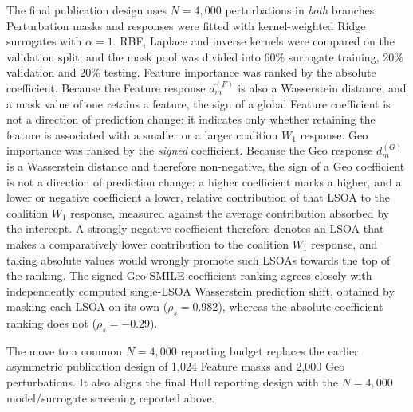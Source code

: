 The final publication design uses $N=4{,}000$ perturbations in \emph{both} branches. Perturbation masks and responses were fitted with kernel-weighted Ridge surrogates with $\alpha=1$. RBF, Laplace and inverse kernels were compared on the validation split, and the mask pool was divided into 60\% surrogate training, 20\% validation and 20\% testing. Feature importance was ranked by the absolute coefficient. Because the Feature response $d_m^{(F)}$ is also a Wasserstein distance, and a mask value of one retains a feature, the sign of a global Feature coefficient is not a direction of prediction change: it indicates only whether retaining the feature is associated with a smaller or a larger coalition $W_1$ response. Geo importance was ranked by the \emph{signed} coefficient. Because the Geo response $d_m^{(G)}$ is a Wasserstein distance and therefore non-negative, the sign of a Geo coefficient is not a direction of prediction change: a higher coefficient marks a higher, and a lower or negative coefficient a lower, relative contribution of that LSOA to the coalition $W_1$ response, measured against the average contribution absorbed by the intercept. A strongly negative coefficient therefore denotes an LSOA that makes a comparatively lower contribution to the coalition $W_1$ response, and taking absolute values would wrongly promote such LSOAs towards the top of the ranking. The signed Geo-SMILE coefficient ranking agrees closely with independently computed single-LSOA Wasserstein prediction shift, obtained by masking each LSOA on its own ($\rho_s=0.982$), whereas the absolute-coefficient ranking does not ($\rho_s=-0.29$).

The move to a common $N=4{,}000$ reporting budget replaces the earlier asymmetric publication design of 1,024 Feature masks and 2,000 Geo perturbations. It also aligns the final Hull reporting design with the $N=4{,}000$ model/surrogate screening reported above.

